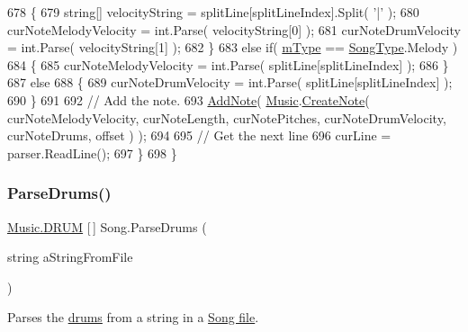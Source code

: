 \begin{DoxyCode}
678             \{
679                 \textcolor{keywordtype}{string}[] velocityString = splitLine[splitLineIndex].Split( \textcolor{charliteral}{'|'} );
680                 curNoteMelodyVelocity = \textcolor{keywordtype}{int}.Parse( velocityString[0] );
681                 curNoteDrumVelocity = \textcolor{keywordtype}{int}.Parse( velocityString[1] );
682             \}
683             \textcolor{keywordflow}{else} \textcolor{keywordflow}{if}( \hyperlink{group___song_priv_var_gaf3b9d0f461522324f897b746311b43c5}{mType} == \hyperlink{group___song_enums_gae681a1f001333e39fc1cb4fea97bfe1b}{SongType}.Melody )
684             \{
685                 curNoteMelodyVelocity = \textcolor{keywordtype}{int}.Parse( splitLine[splitLineIndex] );
686             \}
687             \textcolor{keywordflow}{else}
688             \{
689                 curNoteDrumVelocity = \textcolor{keywordtype}{int}.Parse( splitLine[splitLineIndex] );
690             \}
691 
692             \textcolor{comment}{// Add the note.}
693             \hyperlink{group___song_pub_func_gab7c8fe4dc29f5ae7b7728c583fe51f7e}{AddNote}( \hyperlink{class_music}{Music}.\hyperlink{group___music_stat_func_gaaf74885e43eb623f64f961985fadcd08}{CreateNote}( curNoteMelodyVelocity, curNoteLength, 
      curNotePitches, curNoteDrumVelocity, curNoteDrums, offset ) );
694 
695             \textcolor{comment}{// Get the next line}
696             curLine = parser.ReadLine();
697         \}
698     \}
\end{DoxyCode}
\mbox{\label{group___song_priv_func_gaaa4ca12f0885a34cbfb09bb7a1db178b}} 
\subsubsection{\texorpdfstring{Parse\+Drums()}{ParseDrums()}}
{\footnotesize\ttfamily \hyperlink{group___music_enums_gade475b4382c7066d1af13e7c13c029b6}{Music.\+D\+R\+UM} \mbox{[}$\,$\mbox{]} Song.\+Parse\+Drums (\begin{DoxyParamCaption}\item[{string}]{a\+String\+From\+File }\end{DoxyParamCaption})\hspace{0.3cm}{\ttfamily [private]}}



Parses the \hyperlink{group___music_enums_gade475b4382c7066d1af13e7c13c029b6}{drums} from a string in a \hyperlink{group___song_group_DocSongFileFormat}{Song file}. 



